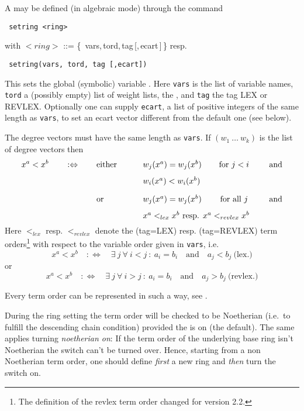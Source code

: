A  may be defined (in algebraic mode) through the
command
\begin{verbatim}
 setring <ring>
\end{verbatim}
with $<ring>$ ::= \{\, vars,\,tord,\,tag\,[,\,ecart\,]\,\} resp.
\begin{verbatim}
 setring(vars, tord, tag [,ecart])
\end{verbatim}
This sets the global (symbolic) variable . Here
{\tt vars} is the list of variable names, {\tt tord} a (possibly
empty) list of weight lists, the , and {\tt tag}
the tag LEX or REVLEX. Optionally one can supply {\tt ecart}, a list
of positive integers of the same length as {\tt vars}, to set an ecart
vector different from the default one (see below).

The degree vectors must have the same length as {\tt vars}. If $(w_1\
\ldots\ w_k)$ is the list of degree vectors then
\[x^a<x^b \qquad :\Leftrightarrow \qquad
\parbox[t]{8cm}{either\hfill
\parbox[t]{6cm}{$w_j(x^a)=w_j(x^b)$\hfill for $j<i$ \hfill and \\[8pt]
$w_i(x^a)<w_i(x^b)$} \\[10pt] or\hfill
\parbox[t]{6cm}{$w_j(x^a)=w_j(x^b)$\hfill for all $j$ \hfill and \\[8pt]
$x^a<_{lex}x^b$ resp. $x^a<_{revlex}x^b$}}
\]
Here $<_{lex}$ resp. $<_{revlex}$ denote the
 (tag=LEX) resp. 
(tag=REVLEX) term orders\footnote{The definition of the revlex term
order changed for version 2.2.}
with respect to the variable order given in {\tt vars}, i.e.\
\[x^a<x^b \quad :\Leftrightarrow \quad
\exists\ j\ \forall\ i<j\ :\ a_i=b_i\quad\mbox{and}\quad a_j<b_j\
\mbox{(lex.)}\]
or
\[x^a<x^b \quad :\Leftrightarrow \quad
\exists\ j\ \forall\ i>j\ :\ a_i=b_i\quad\mbox{and}\quad a_j>b_j\
\mbox{(revlex.)}\]

Every term order can be represented in such a way, see \cite{MR88}.

During the ring setting the term order will be checked to be
Noetherian (i.e.\ to fulfill the descending chain condition) provided
the \ind{switch Noetherian} is on (the default). The same applies
turning {\em noetherian on}: If the term order of the underlying
base ring isn't Noetherian the switch can't be turned over. Hence,
starting from a non Noetherian term order, one should define {\em
first} a new ring and {\em then} turn the switch on.

